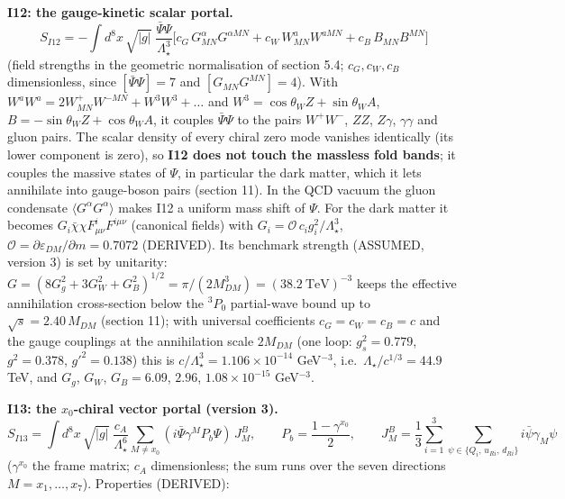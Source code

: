 \documentclass[
  10pt,
]{article}
\begin{document}
\textbf{I12: the gauge-kinetic scalar portal.}
\[ S_{I12} = -\int d^8x\,\sqrt{|g|}\;\frac{\bar\Psi\Psi}{\Lambda_\star^{3}}\Big[c_G\,G^\alpha_{MN}G^{\alpha MN} + c_W\,W^a_{MN}W^{aMN} + c_B\,B_{MN}B^{MN}\Big] \]
(field strengths in the geometric normalisation of section 5.4;
\(c_G, c_W, c_B\) dimensionless, since \([\bar\Psi\Psi] = 7\) and
\([G_{MN}G^{MN}] = 4\)). With
\(W^aW^a = 2W^+_{MN}W^{-MN} + W^3W^3 + \dots\) and
\(W^3 = \cos\theta_W Z + \sin\theta_W A\),
\(B = -\sin\theta_W Z + \cos\theta_W A\), it couples \(\bar\Psi\Psi\) to
the pairs \(W^+W^-\), \(ZZ\), \(Z\gamma\), \(\gamma\gamma\) and gluon
pairs. The scalar density of every chiral zero mode vanishes identically
(its lower component is zero), so \textbf{I12 does not touch the
massless fold bands}; it couples the massive states of \(\Psi\), in
particular the dark matter, which it lets annihilate into gauge-boson
pairs (section 11). In the QCD vacuum the gluon condensate
\(\langle G^\alpha G^\alpha\rangle\) makes I12 a uniform mass shift of
\(\Psi\). For the dark matter it becomes
\(G_i\bar\chi\chi F^i_{\mu\nu}F^{i\mu\nu}\) (canonical fields) with
\(G_i = \mathcal O\,c_ig_i^2/\Lambda_\star^3\),
\(\mathcal O = \partial\varepsilon_{DM}/\partial m = 0.7072\) (DERIVED).
Its benchmark strength (ASSUMED, version 3) is set by unitarity:
\(G = (8G_g^2 + 3G_W^2 + G_B^2)^{1/2} = \pi/(2M_{DM}^3) = (38.2\ \text{TeV})^{-3}\)
keeps the effective annihilation cross-section below the \(^3P_0\)
partial-wave bound up to \(\sqrt s = 2.40\,M_{DM}\) (section 11); with
universal coefficients \(c_G = c_W = c_B = c\) and the gauge couplings
at the annihilation scale \(2M_{DM}\) (one loop: \(g_s^2 = 0.779\),
\(g^2 = 0.378\), \(g'^2 = 0.138\)) this is
\(c/\Lambda_\star^3 = 1.106\times10^{-14}\) GeV\(^{-3}\),
i.e.~\(\Lambda_\star/c^{1/3} = 44.9\) TeV, and \(G_g\), \(G_W\),
\(G_B = 6.09\), \(2.96\), \(1.08\times10^{-15}\) GeV\(^{-3}\).

\textbf{I13: the \(x_0\)-chiral vector portal (version 3).}
\[ S_{I13} = \int d^8x\,\sqrt{|g|}\;\frac{c_A}{\Lambda_\star^6}\sum_{M \ne x_0}(i\bar\Psi\gamma^MP_b\Psi)\,J^B_M,\qquad P_b = \frac{1 - \gamma^{x_0}}{2},\qquad
   J^B_M = \frac13\sum_{i=1}^{3}\sum_{\psi\in\{Q_i,\,u_{Ri},\,d_{Ri}\}}i\bar\psi\gamma_M\psi \]
(\(\gamma^{x_0}\) the frame matrix; \(c_A\) dimensionless; the sum runs
over the seven directions \(M = x_1, \dots, x_7\)). Properties
(DERIVED):
\end{document}
